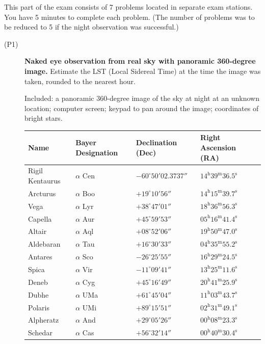 This part of the exam consists of 7 problems located in separate exam
stations. You have 5 minutes to complete each problem. (The number of problems
was to be reduced to 5 if the night observation was successful.)

\begin{description}
\item[(P1)] \textbf{Naked eye observation from real sky with panoramic
  360-degree image.} Estimate the LST (Local Sidereal Time) at the time the
  image was taken, rounded to the nearest hour.

  Included: a panoramic 360-degree image of the sky at night at an unknown
  location; computer screen; keypad to pan around the image; coordinates of
  bright stars.

  \begin{center}
  \begin{tabular}{llll}
  Name & Bayer Designation & Declination (Dec) & Right Ascension (RA) \\
  \hline
  Rigil Kentaurus & $\alpha$ Cen & $-60^\circ 50' 02.3737''$
    & $14^{\mathrm{h}}39^{\mathrm{m}}36.5^{\mathrm{s}}$ \\
  Arcturus & $\alpha$ Boo & $+19^\circ 10' 56''$
    & $14^{\mathrm{h}}15^{\mathrm{m}}39.7^{\mathrm{s}}$ \\
  Vega & $\alpha$ Lyr & $+38^\circ 47' 01''$
    & $18^{\mathrm{h}}36^{\mathrm{m}}56.3^{\mathrm{s}}$ \\
  Capella & $\alpha$ Aur & $+45^\circ 59' 53''$
    & $05^{\mathrm{h}}16^{\mathrm{m}}41.4^{\mathrm{s}}$ \\
  Altair & $\alpha$ Aql & $+08^\circ 52' 06''$
    & $19^{\mathrm{h}}50^{\mathrm{m}}47.0^{\mathrm{s}}$ \\
  Aldebaran & $\alpha$ Tau & $+16^\circ 30' 33''$
    & $04^{\mathrm{h}}35^{\mathrm{m}}55.2^{\mathrm{s}}$ \\
  Antares & $\alpha$ Sco & $-26^\circ 25' 55''$
    & $16^{\mathrm{h}}29^{\mathrm{m}}24.5^{\mathrm{s}}$ \\
  Spica & $\alpha$ Vir & $-11^\circ 09' 41''$
    & $13^{\mathrm{h}}25^{\mathrm{m}}11.6^{\mathrm{s}}$ \\
  Deneb & $\alpha$ Cyg & $+45^\circ 16' 49''$
    & $20^{\mathrm{h}}41^{\mathrm{m}}25.9^{\mathrm{s}}$ \\
  Dubhe & $\alpha$ UMa & $+61^\circ 45' 04''$
    & $11^{\mathrm{h}}03^{\mathrm{m}}43.7^{\mathrm{s}}$ \\
  Polaris & $\alpha$ UMi & $+89^\circ 15' 51''$
    & $02^{\mathrm{h}}31^{\mathrm{m}}49.1^{\mathrm{s}}$ \\
  Alpheratz & $\alpha$ And & $+29^\circ 05' 26''$
    & $00^{\mathrm{h}}08^{\mathrm{m}}23.3^{\mathrm{s}}$ \\
  Schedar & $\alpha$ Cas & $+56^\circ 32' 14''$
    & $00^{\mathrm{h}}40^{\mathrm{m}}30.4^{\mathrm{s}}$ \\
  \end{tabular}
  \end{center}


\end{description}
